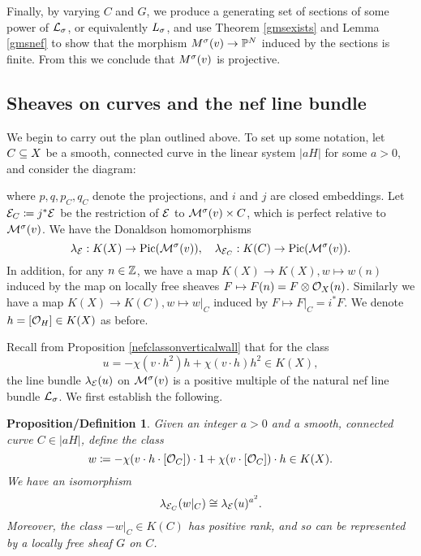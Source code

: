 \documentclass[letterpaper,11pt]{amsart}%
\newtheorem{propdef}[thm]{Proposition/Definition}
\theoremstyle{remark}
\begin{document}
Finally, by varying $C$ and $G$, we produce a generating set of sections of some power of $\mathcal{L}_\sigma$, or equivalently $L_\sigma$, and use Theorem \ref{gmsexists} and Lemma \ref{gmsnef} to show that the morphism $M^\sigma(v) \to \mathbb{P}^N$ induced by the sections is finite. From this we conclude that $M^\sigma(v)$ is projective.

\subsection{Sheaves on curves and the nef line bundle}
We begin to carry out the plan outlined above. To set up some notation, let $C \subseteq X$ be a smooth, connected curve in the linear system $|a H|$ for some $a > 0$, and consider the diagram:
\begin{center}
\end{center}
where $p, q, p_C, q_C$ denote the projections, and $i$ and $j$ are closed embeddings. Let $\mathcal{E}_C \coloneqq j^*\mathcal{E}$ be the restriction of $\mathcal{E}$ to $\mathcal{M}^\sigma(v) \times C$, which is perfect relative to $\mathcal{M}^\sigma(v)$. We have the Donaldson homomorphisms
\[ \lambda_{\mathcal{E}}: K(X) \to \mathrm{Pic}(\mathcal{M}^\sigma(v)), \quad \lambda_{\mathcal{E}_C}: K(C) \to \mathrm{Pic}(\mathcal{M}^\sigma(v)). \]
In addition, for any $n \in \mathbb{Z}$, we have a map $K(X) \to K(X), w \mapsto w(n)$ induced by the map on locally free sheaves $F \mapsto F(n) = F \otimes \mathcal{O}_X(n)$. Similarly we have a map $K(X) \to K(C), w \mapsto w|_C$ induced by $F \mapsto F|_C = i^*F$. We denote $h = [\mathcal{O}_H] \in K(X)$ as before.

Recall from Proposition \ref{nefclassonverticalwall} that for the class 
\[ u = -\chi(v \cdot h^2) h + \chi(v \cdot h) h^2 \in K(X), \]
the line bundle $\lambda_{\mathcal{E}}(u)$ on $\mathcal{M}^\sigma(v)$ is a positive multiple of the natural nef line bundle $\mathcal{L}_\sigma$. We first establish the following.
\begin{propdef}\label{nefpowerfromcurves}
    Given an integer $a > 0$ and a smooth, connected curve $C \in |a H|$, define the class
    \[ w \coloneqq -\chi(v \cdot h \cdot [\mathcal{O}_C]) \cdot 1 + \chi(v \cdot [\mathcal{O}_C]) \cdot h \in K(X). \]
    We have an isomorphism
    \[ \lambda_{\mathcal{E}_C}(w|_C) \cong \lambda_{\mathcal{E}}(u)^{a^2}. \]
    Moreover, the class $-w|_C \in K(C)$ has positive rank, and so can be represented by a locally free sheaf $G$ on $C$.
\end{propdef}
\end{document}
